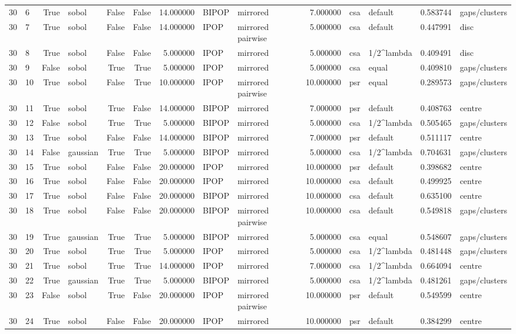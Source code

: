 \begin{tabular}{rlrlrrrllrllrl}
30 & 6 & True & sobol & False & False & 14.000000 & BIPOP & mirrored & 7.000000 & csa & default & 0.583744 & gaps/clusters \\
30 & 7 & True & sobol & False & False & 14.000000 & IPOP & mirrored pairwise & 5.000000 & csa & default & 0.447991 & disc \\
30 & 8 & True & sobol & False & False & 5.000000 & IPOP & mirrored & 5.000000 & csa & 1/2^lambda & 0.409491 & disc \\
30 & 9 & False & sobol & True & True & 5.000000 & IPOP & mirrored & 5.000000 & csa & equal & 0.409810 & gaps/clusters \\
30 & 10 & True & sobol & False & True & 10.000000 & IPOP & mirrored pairwise & 10.000000 & psr & equal & 0.289573 & gaps/clusters \\
30 & 11 & True & sobol & True & False & 14.000000 & BIPOP & mirrored & 7.000000 & psr & default & 0.408763 & centre \\
30 & 12 & False & sobol & True & True & 5.000000 & BIPOP & mirrored & 5.000000 & csa & 1/2^lambda & 0.505465 & gaps/clusters \\
30 & 13 & True & sobol & False & False & 14.000000 & BIPOP & mirrored & 7.000000 & psr & default & 0.511117 & centre \\
30 & 14 & False & gaussian & True & True & 5.000000 & BIPOP & mirrored & 5.000000 & csa & 1/2^lambda & 0.704631 & gaps/clusters \\
30 & 15 & True & sobol & False & False & 20.000000 & IPOP & mirrored & 10.000000 & psr & default & 0.398682 & centre \\
30 & 16 & True & sobol & False & False & 20.000000 & IPOP & mirrored & 10.000000 & csa & default & 0.499925 & centre \\
30 & 17 & True & sobol & False & False & 20.000000 & BIPOP & mirrored & 10.000000 & csa & default & 0.635100 & centre \\
30 & 18 & True & sobol & False & False & 20.000000 & BIPOP & mirrored pairwise & 10.000000 & csa & default & 0.549818 & gaps/clusters \\
30 & 19 & True & gaussian & True & True & 5.000000 & BIPOP & mirrored & 5.000000 & csa & equal & 0.548607 & gaps/clusters \\
30 & 20 & True & sobol & True & True & 5.000000 & IPOP & mirrored & 5.000000 & csa & 1/2^lambda & 0.481448 & gaps/clusters \\
30 & 21 & True & sobol & True & True & 14.000000 & IPOP & mirrored & 7.000000 & csa & 1/2^lambda & 0.664094 & centre \\
30 & 22 & True & gaussian & True & True & 5.000000 & BIPOP & mirrored & 5.000000 & csa & 1/2^lambda & 0.481261 & gaps/clusters \\
30 & 23 & False & sobol & True & False & 20.000000 & IPOP & mirrored pairwise & 10.000000 & psr & default & 0.549599 & centre \\
30 & 24 & True & sobol & False & False & 20.000000 & IPOP & mirrored & 10.000000 & psr & default & 0.384299 & centre \\
\bottomrule
\end{tabular}
